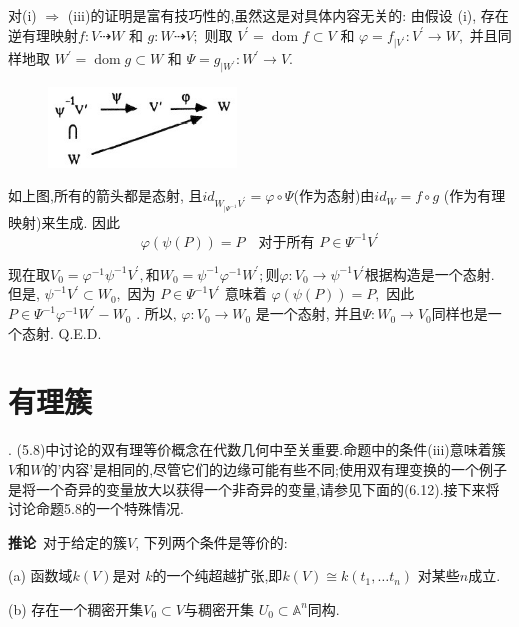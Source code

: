 \documentclass[UTF8]{book}
\begin{document}
		对(i) $\Rightarrow$ (iii)的证明是富有技巧性的,虽然这是对具体内容无关的: 由假设 (i), 存在逆有理映射$ f : V \dashrightarrow W$ 和 $ g : W \dashrightarrow V ; $ 则取 $ V ^{\prime}=\operatorname{dom} f \subset V $ 和 $\varphi= f _{ |V ^{\prime}}: V ^{\prime} \rightarrow W ,$ 并且同样地取 $W ^{\prime}=\operatorname{dom} g \subset W$ 和 $\Psi= g_{| W ^{\prime}}: W ^{\prime} \rightarrow V .$
		\begin{figure}[H]
			\centering
			\includegraphics[width=5cm]{58.jpg}\\
		\end{figure}
		
		如上图,所有的箭头都是态射, 且$id_{W_{|\Psi^{-1}}V^{\prime}}=\varphi \circ \Psi$(作为态射)由$ id_{W} = f\circ g $ (作为有理映射)来生成. 因此
		\begin{equation*}
		\varphi(\psi( P ))= P \quad \text {对于所有 } P \in \Psi^{-1} V ^{\prime}
		\end{equation*}
		
		
		现在取$V _{0}=\varphi^{-1} \psi^{-1} V ^{\prime},$和$W _{0}=\psi^{-1} \varphi^{-1} W ^{\prime} ;$则$\varphi: V_{0} \rightarrow \psi^{-1} V ^{\prime}$根据构造是一个态射. 但是, $\psi^{-1} V ^{\prime} \subset W _{0},$ 因为 $P \in \Psi^{-1} V ^{\prime}$ 意味着 $\varphi(\psi( P ))= P ,$ 因此$P \in \Psi^{-1} \varphi^{-1} W ^{\prime}- W_{0}$ . 所以, $\varphi: V _{0} \rightarrow W _{0}$ 是一个态射, 并且$\Psi: W _{0} \rightarrow V _{0}$同样也是一个态射. Q.E.D.
		
		
	\section{有理簇}. 
		(5.8)中讨论的双有理等价概念在代数几何中至关重要.命题中的条件(iii)意味着簇$ V $和$ W $的'内容'是相同的,尽管它们的边缘可能有些不同;使用双有理变换的一个例子是将一个奇异的变量放大以获得一个非奇异的变量,请参见下面的(6.12).接下来将讨论命题5.8的一个特殊情况.
		
		
		\textbf{推论}\  对于给定的簇$V$, 下列两个条件是等价的:
		
		
		(a) 函数域$k ( V )$是对 $k $的一个纯超越扩张,即$k ( V ) \cong k \left( t _{1}, \ldots t _{ n }\right)$ 对某些$n$成立.
		
		
		(b) 存在一个稠密开集$V _{0} \subset V$与稠密开集 $U_{0} \subset \mathbb{A} ^{n}$同构.
		
\end{document}
